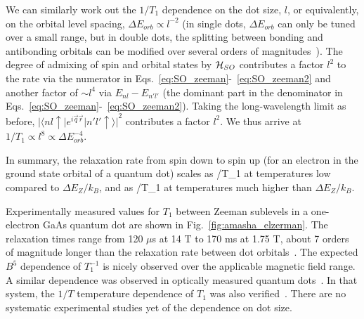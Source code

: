 \documentclass[12pt,aps,nofootinbib]{revtex4-1}
\begin{document}
We can similarly work out the $1/T_1$ dependence on the dot size, $l$, or equivalently, on the orbital level spacing, $\Delta E_{orb} \propto l^{-2}$ (in single dots, $\Delta E_{orb}$ can only be tuned over a small range, but in double dots, the splitting between bonding and antibonding orbitals can be modified over several orders of magnitudes~\cite{wang06}). The degree of admixing of spin and orbital states by ${\cal H}_{SO}$ contributes a factor $l^2$ to the rate via the numerator in Eqs.~\ref{eq:SO_zeeman}-~\ref{eq:SO_zeeman2} and another factor of $\sim l^4$ via $E_{nl} - E_{n'l'}$ (the dominant part in the denominator in Eqs.~\ref{eq:SO_zeeman}-~\ref{eq:SO_zeeman2}). Taking the long-wavelength limit as before, $|\langle n l \uparrow | e^{i\vec{q}\vec{r}} | n' l' \uparrow \rangle|^2$ contributes a factor $l^2$. We thus arrive at $1/T_1 \propto l^8 \propto \Delta E_{orb}^{-4}$.

In summary, the relaxation rate from spin down to spin up (for an electron in the ground state orbital of a quantum dot) scales as
/T_1 \propto {}
\ee
at temperatures low compared to $\Delta E_Z /k_B$, and as
/T_1 \propto {}
\ee
at temperatures much higher than $\Delta E_Z /k_B$.

Experimentally measured values for $T_1$ between Zeeman sublevels in a one-electron GaAs quantum dot are shown in Fig.~\ref{fig:amasha_elzerman}. The relaxation times range from 120 $\mu$s at 14 T to 170 ms at 1.75 T, about 7 orders of magnitude longer than the relaxation rate between dot orbitals~\cite{FujisawaNature2002}. The expected $B^5$ dependence of $T_1^{-1}$ is nicely observed over the applicable magnetic field range. A similar dependence was observed in optically measured quantum dots~\cite{kroutvar04}. In that system, the $1/T$ temperature dependence of $T_1$ was also verified~\cite{heiss05}. There are no systematic experimental studies yet of the dependence on dot size.
\end{document}

